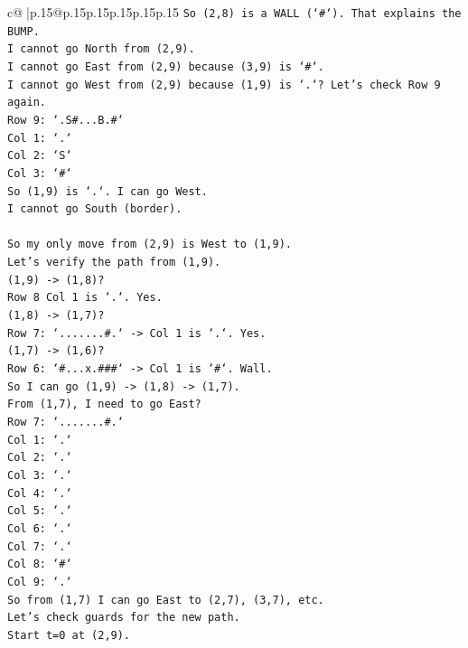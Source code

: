 \documentclass{article}
\begin{document}
{\begin{supertabular}{c@{$\;$}|p{.15\linewidth}@{}p{.15\linewidth}p{.15\linewidth}p{.15\linewidth}p{.15\linewidth}p{.15\linewidth}}
{{{\texttt{So (2,8) is a WALL (`\#`). That explains the BUMP.} \\
\texttt{I cannot go North from (2,9).} \\
\texttt{I cannot go East from (2,9) because (3,9) is `\#`.} \\
\texttt{I cannot go West from (2,9) because (1,9) is `.`? Let's check Row 9 again.} \\
\texttt{Row 9: `.S\#...B.\#`} \\
\texttt{Col 1: `.`} \\
\texttt{Col 2: `S`} \\
\texttt{Col 3: `\#`} \\
\texttt{So (1,9) is `.`. I can go West.} \\
\texttt{I cannot go South (border).} \\
\\ 
\texttt{So my only move from (2,9) is West to (1,9).} \\
\texttt{Let's verify the path from (1,9).} \\
\texttt{(1,9) {-}> (1,8)?} \\
\texttt{Row 8 Col 1 is `.`. Yes.} \\
\texttt{(1,8) {-}> (1,7)?} \\
\texttt{Row 7: `.......\#.` {-}> Col 1 is `.`. Yes.} \\
\texttt{(1,7) {-}> (1,6)?} \\
\texttt{Row 6: `\#...x.\#\#\#` {-}> Col 1 is `\#`. Wall.} \\
\texttt{So I can go (1,9) {-}> (1,8) {-}> (1,7).} \\
\texttt{From (1,7), I need to go East?} \\
\texttt{Row 7: `.......\#.`} \\
\texttt{Col 1: `.`} \\
\texttt{Col 2: `.`} \\
\texttt{Col 3: `.`} \\
\texttt{Col 4: `.`} \\
\texttt{Col 5: `.`} \\
\texttt{Col 6: `.`} \\
\texttt{Col 7: `.`} \\
\texttt{Col 8: `\#`} \\
\texttt{Col 9: `.`} \\
\texttt{So from (1,7) I can go East to (2,7), (3,7), etc.} \\
\texttt{Let's check guards for the new path.} \\
\texttt{Start t=0 at (2,9).} \\
}}}
\end{supertabular}}
\end{document}
